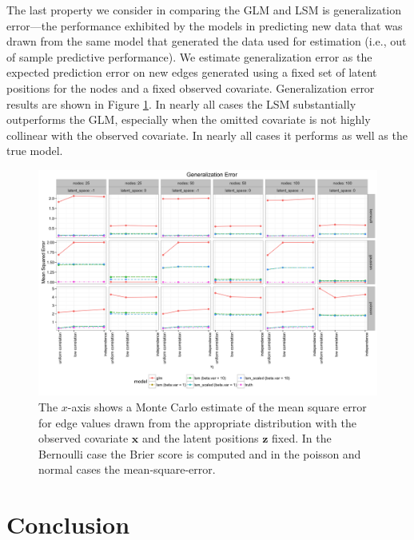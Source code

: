 \documentclass[11pt]{article}
\begin{document}
The last property we consider in comparing the GLM and LSM is generalization error---the performance exhibited by the models in predicting new data that was drawn from the same model that generated the data used for estimation (i.e., out of sample predictive performance). We estimate generalization error as the expected prediction error on new edges generated using a fixed set of latent positions for the nodes and a fixed observed covariate. Generalization error results are shown in Figure \ref{fig:generalization}. In nearly all cases the LSM substantially outperforms the GLM, especially when the omitted covariate is not highly collinear with the observed covariate. In nearly all cases it performs as well as the true model. 

\begin{figure}
\includegraphics[width=\textwidth]{figures/generalization.png}
\caption{The $x$-axis shows a Monte Carlo estimate of the mean square error for edge values drawn from the appropriate distribution with the observed covariate $\mathbf{x}$ and the latent positions $\mathbf{z}$ fixed. In the Bernoulli case the Brier score is computed and in the poisson and normal cases the mean-square-error. \label{fig:generalization}}
\end{figure}

\section{Conclusion}
\end{document}
